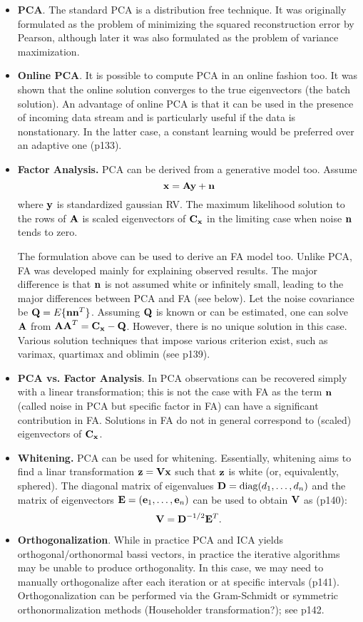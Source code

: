 \documentclass[a4paper, one	side]{book}
\begin{document}
\begin{itemize}
\item \textbf{PCA}. The standard PCA is a distribution free technique. It was originally formulated as the problem of minimizing the squared reconstruction error by Pearson, although later it was also formulated as the problem of  variance maximization. 
\item \textbf{Online PCA}. It is possible to compute PCA in an online fashion too. It was shown that the online solution converges to the true eigenvectors (\ie the batch solution). An advantage of online PCA is that it can be used in the presence of incoming data stream and is particularly useful if the data is nonstationary. In the latter case, a constant learning would be preferred over an adaptive one (p133).
\item \textbf{Factor Analysis.} PCA can be derived from a generative model too. Assume $$\mathbf{x = Ay + n}$$ 
where $\mathbf y$ is standardized gaussian RV. The maximum likelihood solution to the rows of $\mathbf A$ is scaled eigenvectors of $\mathbf{C_x}$ in the limiting case when noise $\mathbf n$ tends to zero.

The formulation above can be used to derive an FA model too. Unlike PCA, FA was developed mainly for explaining observed results. The major difference is that $\mathbf n$ is not assumed white or infinitely small, leading to the major differences between PCA and FA (see below). Let the noise covariance be $\mathbf{Q}=E\mathbf\{\mathbf{nn}^T\}$. Assuming $\mathbf{Q}$ is known or can be estimated, one can solve $\mathbf A$ from $\mathbf{AA}^T=\mathbf{C_x-Q}$. However, there is no unique solution in this case. Various solution techniques that impose various criterion exist, such as varimax, quartimax and oblimin (see p139).
\item \textbf{PCA vs. Factor Analysis}. In PCA observations can be recovered simply with a linear transformation; this is not the case with FA as the term $\mathbf n$ (called noise in PCA but specific factor in FA) can have a significant contribution in FA. Solutions in FA do not in general correspond to (scaled) eigenvectors of $\mathbf{C_x}$. 

\item \textbf{Whitening.} PCA  can be used for whitening. Essentially, whitening aims to find a linar transformation $\mathbf{z=Vx}$ such that $\mathbf z$ is white (or, equivalently, sphered). The diagonal matrix of eigenvalues $\mathbf{D}=\text{diag}(d_1,\hdots,d_n)$ and the matrix of eigenvectors $\mathbf{E}=(\mathbf{e}_1,\hdots,\mathbf{e}_n)$ can be used to obtain $\mathbf V$ as (p140): $$\mathbf{V=D}^{-1/2}\mathbf{E}^T.$$

\item \textbf{Orthogonalization}. While in practice PCA and ICA yields orthogonal/orthonormal bassi vectors, in practice the iterative algorithms may be unable to produce orthogonality. In this case, we may need to manually orthogonalize after each iteration or at specific intervals (p141). Orthogonalization can be performed via the Gram-Schmidt or symmetric orthonormalization methods (Householder transformation?); see p142.
\end{itemize}
\end{document}
